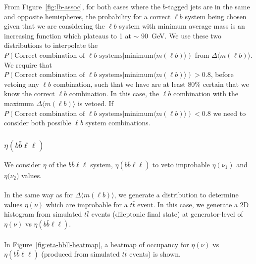 From Figure~\ref{fig:lb-assoc}, for both cases where the $b$-tagged jets are in the same and opposite hemispheres, the probability for a correct $\ell b$ system being chosen given that we are considering the $\ell b$ system with minimum average mass is an increasing function which plateaus to 1 at $\sim$ \SI{90}{\GeV}. We use these two distributions to interpolate the $P(\text{Correct combination of } \ell b \text{ systems} | \text{minimum} \langle m(\ell b) \rangle)$ from $\Delta \langle m(\ell b) \rangle$. We require that $P(\text{Correct combination of } \ell b \text{ systems} | \text{minimum} \langle m(\ell b) \rangle) > 0.8$, before vetoing any $\ell b$ combination, such that we have are at least 80$\%$ certain that we know the correct $\ell b$ combination. In this case, the $\ell b$ combination with the maximum $\Delta \langle m(\ell b) \rangle$ is vetoed. If $P(\text{Correct combination of } \ell b \text{ systems} | \text{minimum} \langle m(\ell b) \rangle) < 0.8$ we need to consider both possible $\ell b$ system combinations. 

\subsubsection{$\eta(b\bar{b}\ell\ell)$}
\label{sec:eta-llbb-subsection}

We consider $\eta$ of the $b\bar{b}\ell\ell$ system, $\eta(b\bar{b}\ell\ell)$ to veto improbable $\eta(\nu_{1})$ and $\eta(\nu_{2}$) values.\\\\

In the same way as for $\Delta \langle m(\ell b)\rangle$, we generate a distribution to determine values $\eta(\nu)$ which are improbable for a $t\bar{t}$ event. In this case, we generate a 2D histogram from simulated $t\bar{t}$ events (dileptonic final state) at generator-level of $\eta (\nu)$ vs $\eta(b\bar{b}\ell\ell)$.\\\\
In Figure~\ref{fig:eta-bbll-heatmap}, a heatmap of occupancy for $\eta (\nu)$ vs $\eta(b\bar{b}\ell\ell)$ (produced from simulated $t\bar{t}$ events) is shown. 


